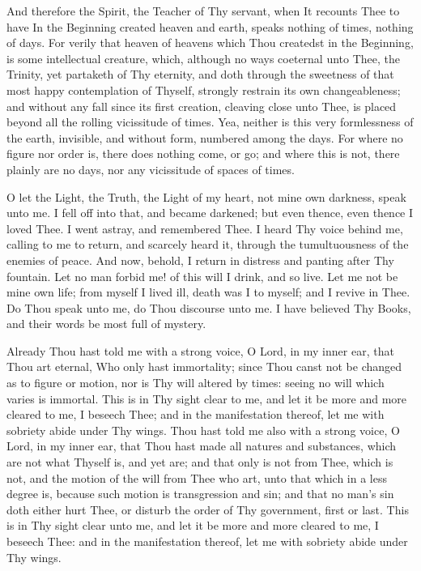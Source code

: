 \documentclass[b5paper,openright,12pt,twoside]{book}
\begin{document}
And therefore the Spirit, the Teacher of Thy servant, when It recounts
Thee to have In the Beginning created heaven and earth, speaks nothing
of times, nothing of days. For verily that heaven of heavens which
Thou createdst in the Beginning, is some intellectual creature, which,
although no ways coeternal unto Thee, the Trinity, yet partaketh of
Thy eternity, and doth through the sweetness of that most happy
contemplation of Thyself, strongly restrain its own changeableness; and
without any fall since its first creation, cleaving close unto Thee, is
placed beyond all the rolling vicissitude of times. Yea, neither is this
very formlessness of the earth, invisible, and without form, numbered
among the days. For where no figure nor order is, there does nothing
come, or go; and where this is not, there plainly are no days, nor any
vicissitude of spaces of times.

O let the Light, the Truth, the Light of my heart, not mine own
darkness, speak unto me. I fell off into that, and became darkened; but
even thence, even thence I loved Thee. I went astray, and remembered
Thee. I heard Thy voice behind me, calling to me to return, and scarcely
heard it, through the tumultuousness of the enemies of peace. And now,
behold, I return in distress and panting after Thy fountain. Let no man
forbid me! of this will I drink, and so live. Let me not be mine own
life; from myself I lived ill, death was I to myself; and I revive in
Thee. Do Thou speak unto me, do Thou discourse unto me. I have believed
Thy Books, and their words be most full of mystery.

Already Thou hast told me with a strong voice, O Lord, in my inner ear,
that Thou art eternal, Who only hast immortality; since Thou canst not
be changed as to figure or motion, nor is Thy will altered by times:
seeing no will which varies is immortal. This is in Thy sight clear to
me, and let it be more and more cleared to me, I beseech Thee; and in
the manifestation thereof, let me with sobriety abide under Thy wings.
Thou hast told me also with a strong voice, O Lord, in my inner ear,
that Thou hast made all natures and substances, which are not what
Thyself is, and yet are; and that only is not from Thee, which is not,
and the motion of the will from Thee who art, unto that which in a less
degree is, because such motion is transgression and sin; and that no
man's sin doth either hurt Thee, or disturb the order of Thy government,
first or last. This is in Thy sight clear unto me, and let it be
more and more cleared to me, I beseech Thee: and in the manifestation
thereof, let me with sobriety abide under Thy wings.
\end{document}

